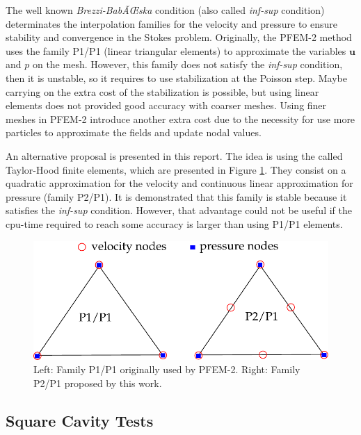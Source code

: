 The well known \textit{Brezzi-BabÃŒska} condition (also called \textit{inf-sup} condition) determinates the interpolation families for the velocity and pressure to ensure stability and convergence in the Stokes problem. Originally, the PFEM-2 method uses the family P1/P1 (linear triangular elements) to approximate the variables $\mathbf{u}$ and $p$ on the mesh\cite{Idelsohn12b}. %
However, this family does not satisfy the \textit{inf-sup} condition, then it is unstable, so it requires to use stabilization at the Poisson step. Maybe carrying on the extra cost of the stabilization is possible, but using linear elements does not provided good accuracy with coarser meshes. Using finer meshes in PFEM-2 introduce another extra cost due to the necessity for use more particles to approximate the fields and update nodal values.

An alternative proposal is presented in this report. The idea is using the called Taylor-Hood finite elements\cite{HoodTaylor73}, which are presented in Figure \ref{fg:taylor-hood}. They consist on a quadratic approximation for the velocity and continuous linear approximation for pressure (family P2/P1). It is demonstrated that this family is stable because it satisfies the \textit{inf-sup} condition. However, that advantage could not be useful if the cpu-time required to reach some accuracy is larger than using P1/P1 elements.

\begin{figure}[htbp]
  \begin{center}
      \includegraphics[width=.9\columnwidth]{../images/taylor_hood.pdf}
  \end{center}
  \caption{\label{fg:taylor-hood} Left: Family P1/P1 originally used by PFEM-2. Right: Family P2/P1 proposed by this work.}
\end{figure}

\subsection{Square Cavity Tests}

